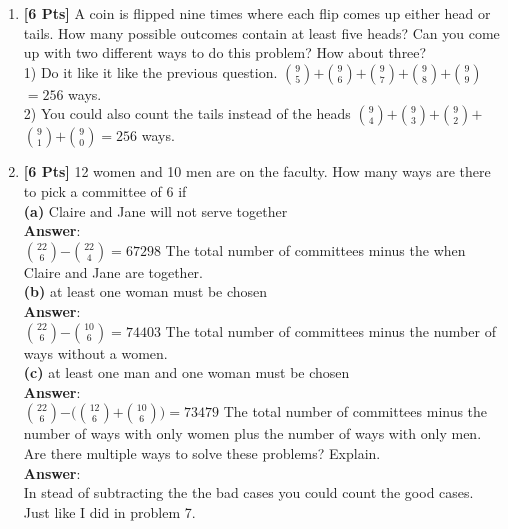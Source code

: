 \documentclass[11pt]{article}
\begin{document}
\begin{enumerate}
\item {\bf [6 Pts]} A coin is flipped nine times where each flip comes up either head or tails. How many possible outcomes contain at least five heads? Can you come up with two different ways to do this problem? How about three?\\
1) Do it like it like the previous question. $9 \choose 5$$+$$9 \choose 6$$+$$9 \choose 7$$+$$9 \choose 8$$+$$9 \choose 9$$ = 256$ ways.\\
2) You could also count the tails instead of the heads $9 \choose 4$$+$$9 \choose 3$$+$$9 \choose 2$$+$$9 \choose 1$$+$$9 \choose 0$$ = 256$ ways.\\

\clearpage

\item {\bf [6 Pts]} 12 women and 10 men are on the faculty. How many ways are there to pick a committee of 6 if\\ 
\textbf{(a)} Claire and Jane will not serve together\\
\textbf{Answer}:\\  
$22 \choose 6$$-$$22 \choose 4$$= 67298$ The total number of committees minus the when Claire and Jane are together.\\

\textbf{(b)} at least one woman must be chosen\\
\textbf{Answer}:\\ 
$22 \choose 6$$-$$10 \choose 6$$= 74403$ The total number of committees minus the number of ways without a women.\\ 


\textbf{(c)} at least one man and one woman must be chosen\\
\textbf{Answer}:\\
$22 \choose 6$$-$$($$12 \choose 6$$+$$10 \choose 6$$)$$= 73479$ The total number of committees minus the number of ways with only women plus the number of ways with only men.\\ 

Are there multiple ways to solve these problems? Explain.\\
\textbf{Answer}:\\
In stead of subtracting the the bad cases you could count the good cases. Just like I did in problem 7.

\end{enumerate}
\end{document}
